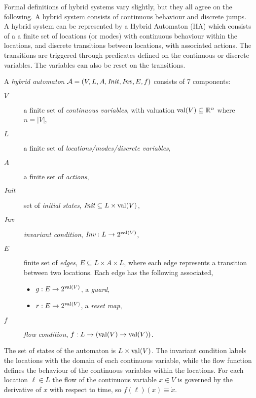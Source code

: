 Formal definitions of hybrid systems vary slightly, but they all agree on the following. A hybrid system consists of continuous behaviour and discrete jumps. A hybrid system can be represented by a Hybrid Automaton (HA) which consists of a a finite set of locations (or modes) with continuous behaviour within the locations, and discrete transitions between locations, with associated actions. The transitions are triggered through predicates defined on the continuous or discrete variables. The variables can also be reset on the transitions.
\begin{defi}[HA]
A \emph{hybrid automaton} $\mathcal{A}=(V,L,A,\mathit{Init},\mathit{Inv},E,f)$ consists of 7 components:
\begin{description}
    \item[$V$]{a finite set of \emph{continuous variables}, with valuation $\operatorname{val}(V)\subseteq\mathbb{R}^n$ where $n=|V|$,}
    \item[$L$]{a finite set of \emph{locations/modes/discrete variables},}
    \item[$A$]{a finite set of \emph{actions},}
    \item[$\mathit{Init}$]{set of \emph{initial states}, $\mathit{Init}\subseteq L \times \operatorname{val}(V)$,}
    \item[$\mathit{Inv}$]{\emph{invariant condition}, $\mathit{Inv}: L \rightarrow 2^{\operatorname{val}(V)}$,}
    \item[$E$]{finite set of \emph{edges}, $E\subseteq L\times A\times L$, where each edge represents a transition between two locations. Each edge has the following associated,
        \begin{itemize}
            \item{$g : E \rightarrow 2^{\operatorname{val}(V)}$, a \emph{guard},}
            \item{$r : E \rightarrow 2^{\operatorname{val}(V)}$, a \emph{reset map},}
        \end{itemize}}
    \item[$f$]{\emph{flow condition}, $f: L\rightarrow (\operatorname{val}(V)\rightarrow\operatorname{val}(V))$.}
\end{description}
\end{defi}

The set of states of the automaton is $L\times\operatorname{val}(V)$. The invariant condition labels the locations with the domain of each continuous variable, while the flow function defines the behaviour of the continuous variables within the locations. For each location $\ell\in L$ the flow of the continuous variable $x\in V$ is governed by the derivative of $x$ with respect to time, so $f(\ell)(x)\equiv\dot{x}$.

